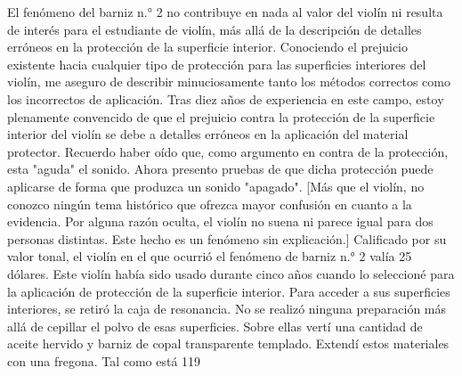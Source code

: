 El fenómeno del barniz n.° 2 no contribuye en nada al valor del violín ni resulta de interés para el estudiante de violín, más allá de la descripción de detalles erróneos en la protección de la superficie interior. Conociendo el prejuicio existente hacia cualquier tipo de protección para las superficies interiores del violín, me aseguro de describir minuciosamente tanto los métodos correctos como los incorrectos de aplicación. Tras diez años de experiencia en este campo, estoy plenamente convencido de que el prejuicio contra la protección de la superficie interior del violín se debe a detalles erróneos en la aplicación del material protector. Recuerdo haber oído que, como argumento en contra de la protección, esta "aguda" el sonido. Ahora presento pruebas de que dicha protección puede aplicarse de forma que produzca un sonido "apagado".
[Más que el violín, no conozco ningún tema histórico que ofrezca mayor confusión en cuanto a la evidencia. Por alguna razón oculta, el violín no suena ni parece igual para dos personas distintas. Este hecho es un fenómeno sin explicación.]
Calificado por su valor tonal, el violín en el que ocurrió el fenómeno de barniz n.° 2 valía 25 dólares. Este violín había sido usado durante cinco años cuando lo seleccioné para la aplicación de protección de la superficie interior. Para acceder a sus superficies interiores, se retiró la caja de resonancia. No se realizó ninguna preparación más allá de cepillar el polvo de esas superficies. Sobre ellas vertí una cantidad de aceite hervido y barniz de copal transparente templado. Extendí estos materiales con una fregona. Tal como está
119

